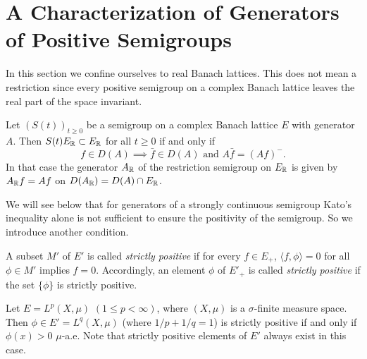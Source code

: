 \section{A Characterization of Generators of Positive Semigroups}\label{sec:c2-3}
In this section we confine ourselves to real Banach lattices.
This does not mean a restriction since every positive semigroup on a complex Banach lattice leaves the real part of the space invariant.
\begin{remark}\label{rem:c2-3.1}
Let $(S(t))_{t \geq 0}$ be a semigroup on a complex Banach lattice $E$ with generator $A$.
Then $S(t)E_{\mathbb{R}} \subset E_{\mathbb{R}}$ for all $t \geq 0$ if and only if
\begin{equation}\label{eq:c2-3.1}
f \in D(A) \implies \bar{f} \in D(A) \text{ and } A\bar{f} = (Af)^{-}  .
\end{equation}
In that case the generator $A_{\mathbb{R}}$ of the restriction semigroup on $E_{\mathbb{R}}$ is given by\\  $A_{\mathbb{R}}f = Af$ on $D(A_{\mathbb{R}}) = D(A) \cap E_{\mathbb{R}}$.
\end{remark}
We will see below that for generators of a strongly continuous semigroup Kato's inequality alone is not sufficient to ensure the positivity of the semigroup.
So we introduce another condition.
\begin{definition}\label{def:c2-3.2}
A subset $M'$ of $E'$ is called \emph{strictly positive} if for every $f \in E_{+}$, $\langle f,\phi \rangle = 0$ for all $\phi \in M'$ implies $f = 0$.
Accordingly, an element $\phi$ of $E'_{+}$ is called \emph{strictly positive} if the set $\{\phi\}$ is strictly positive.
\end{definition}
\begin{example}\label{ex:c2-3.3}
Let $E = L^p(X,\mu)$ $(1 \leq p < \infty)$, where $(X,\mu)$ is a $\sigma$-finite measure space.
Then $\phi \in E'
= L^q(X,\mu)$ (where $1/p + 1/q = 1$) is strictly positive if and only if $\phi(x) > 0$ $\mu$-a.e.
Note that strictly positive elements of $E'$ always exist in this case.
\end{example}
